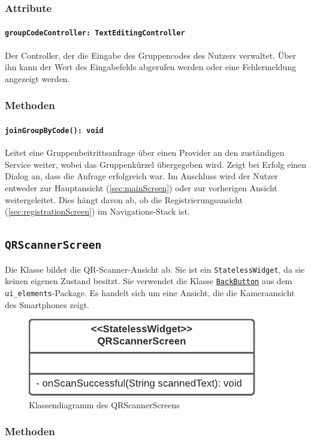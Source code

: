 \documentclass{entwurfsheft}
\begin{document}
\subsubsection*{Attribute}
\paragraph{\texttt{groupCodeController: TextEditingController}}
Der Controller, der die Eingabe des Gruppencodes des Nutzers verwaltet. Über ihn kann der Wert des Eingabefelds abgerufen werden oder eine Fehlermeldung angezeigt werden.
\subsubsection*{Methoden}
\paragraph{\texttt{joinGroupByCode(): void}}
Leitet eine Gruppenbeitrittsanfrage über einen Provider an den zuständigen Service weiter, wobei das Gruppenkürzel übergegeben wird. Zeigt bei Erfolg einen \Gls{Dialog} an, dass die Anfrage erfolgreich war. Im Anschluss wird der Nutzer entweder zur Hauptansicht (\ref{sec:mainScreen}) oder zur vorherigen Ansicht weitergeleitet. Dies hängt davon ab, ob die Registrierungsansicht (\ref{sec:registrationScreen}) im Navigations-Stack ist.
\newpage

\subsection{\texttt{QRScannerScreen}}
\label{sec:qrScannerScreen}
Die Klasse bildet die QR-Scanner-Ansicht ab. Sie ist ein \texttt{StatelessWidget}, da sie keinen eigenen Zustand besitzt. Sie verwendet die Klasse \hyperref[sec:backButton]{\texttt{BackButton}} aus dem \texttt{ui\_elements}-Package. Es handelt sich um eine Ansicht, die die Kameraansicht des Smartphones zeigt.
\begin{figure}
    [htp]
    \centering
    \includegraphics[width=.49\textwidth]{images/presentationLayer/classDiagrams/qrScannerScreen.pdf}
    \caption{Klassendiagramm des QR\-Scanner\-Screens}
\end{figure}
\subsubsection*{Methoden}
\end{document}
